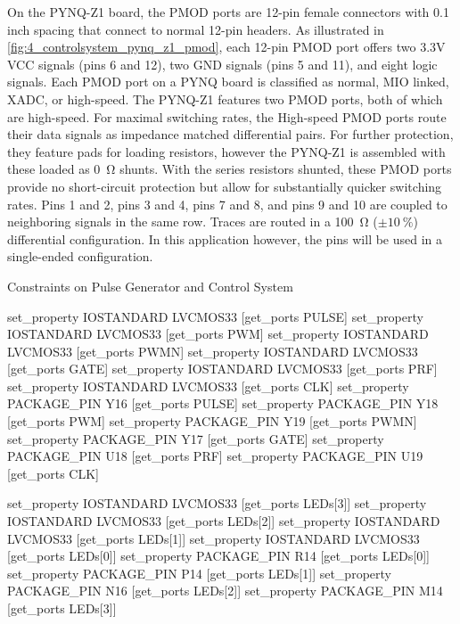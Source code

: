 On the PYNQ-Z1 board, the PMOD ports are 12-pin female connectors with 0.1 inch spacing that connect to normal 12-pin headers. As illustrated in \cref{fig:4_controlsystem_pynq_z1_pmod}, each 12-pin PMOD port offers two 3.3V VCC signals (pins 6 and 12), two GND signals (pins 5 and 11), and eight logic signals. Each PMOD port on a PYNQ board is classified as normal, MIO linked, XADC, or high-speed. The PYNQ-Z1 features two PMOD ports, both of which are high-speed. For maximal switching rates, the High-speed PMOD ports route their data signals as impedance matched differential pairs. For further protection, they feature pads for loading resistors, however the PYNQ-Z1 is assembled with these loaded as \qty{0}{\ohm} shunts. With the series resistors shunted, these PMOD ports provide no short-circuit protection but allow for substantially quicker switching rates. Pins 1 and 2, pins 3 and 4, pins 7 and 8, and pins 9 and 10 are coupled to neighboring signals in the same row. Traces are routed in a \qty{100}{\ohm} ($\pm\qty{10}{\percent}$) differential configuration. In this application however, the pins will be used in a single-ended configuration.

\begin{listing}[htbp]
	\caption{Constraints on Pulse Generator and Control System}
	\label{lst:4_controlsystem_constraints}
	\begin{mintedvhdl}
set_property IOSTANDARD LVCMOS33 [get_ports PULSE]
set_property IOSTANDARD LVCMOS33 [get_ports PWM]
set_property IOSTANDARD LVCMOS33 [get_ports PWMN]
set_property IOSTANDARD LVCMOS33 [get_ports GATE]
set_property IOSTANDARD LVCMOS33 [get_ports PRF]
set_property IOSTANDARD LVCMOS33 [get_ports CLK]
set_property PACKAGE_PIN Y16 [get_ports PULSE]
set_property PACKAGE_PIN Y18 [get_ports PWM]
set_property PACKAGE_PIN Y19 [get_ports PWMN]
set_property PACKAGE_PIN Y17 [get_ports GATE]
set_property PACKAGE_PIN U18 [get_ports PRF]
set_property PACKAGE_PIN U19 [get_ports CLK]

set_property IOSTANDARD LVCMOS33 [get_ports {LEDs[3]}]
set_property IOSTANDARD LVCMOS33 [get_ports {LEDs[2]}]
set_property IOSTANDARD LVCMOS33 [get_ports {LEDs[1]}]
set_property IOSTANDARD LVCMOS33 [get_ports {LEDs[0]}]
set_property PACKAGE_PIN R14 [get_ports {LEDs[0]}]
set_property PACKAGE_PIN P14 [get_ports {LEDs[1]}]
set_property PACKAGE_PIN N16 [get_ports {LEDs[2]}]
set_property PACKAGE_PIN M14 [get_ports {LEDs[3]}]
	\end{mintedvhdl}
\end{listing}

